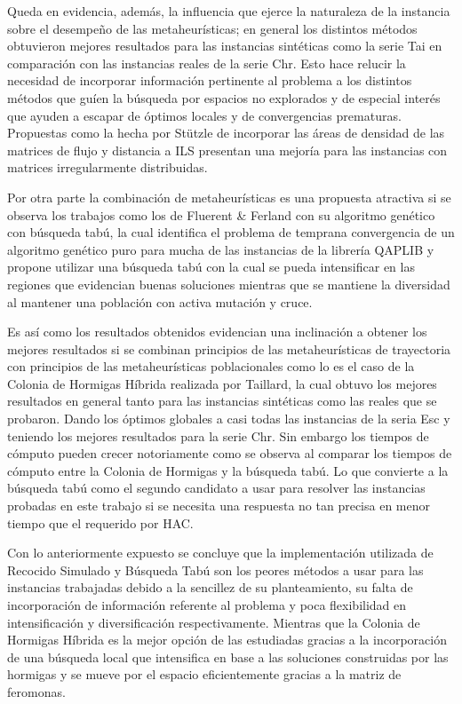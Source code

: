 \documentclass{ci5652}
\begin{document}
Queda en evidencia, además, la influencia que ejerce la naturaleza de la instancia sobre el desempeño de las metaheurísticas; en general los distintos métodos obtuvieron mejores resultados para las instancias sintéticas como la serie Tai en comparación con las instancias reales de la serie Chr. Esto hace relucir la necesidad de incorporar información pertinente al problema a los distintos métodos que guíen la búsqueda por espacios no explorados y de especial interés que ayuden a escapar de óptimos locales y de convergencias prematuras. Propuestas como la hecha por Stützle de incorporar las áreas de densidad de las matrices de flujo y distancia a ILS presentan una mejoría para las instancias con matrices irregularmente distribuidas.

Por otra parte la combinación de metaheurísticas es una propuesta atractiva si se observa los trabajos como los de Fluerent \& Ferland con su algoritmo genético con búsqueda tabú, la cual identifica el problema de temprana convergencia de un algoritmo genético puro para mucha de las instancias de la librería QAPLIB y propone utilizar una búsqueda tabú con la cual se pueda intensificar en las regiones que evidencian buenas soluciones mientras que se mantiene la diversidad al mantener una población con activa mutación y cruce.

Es así como los resultados obtenidos evidencian una inclinación a obtener los mejores resultados si se combinan principios de las metaheurísticas de trayectoria con principios de las metaheurísticas poblacionales como lo es el caso de la Colonia de Hormigas Híbrida realizada por Taillard, la cual obtuvo los mejores resultados en general tanto para las instancias sintéticas como las reales que se probaron. Dando los óptimos globales a casi todas las instancias de la seria Esc y teniendo los mejores resultados para la serie Chr. Sin embargo los tiempos de cómputo pueden crecer notoriamente como se observa al comparar los tiempos de cómputo entre la Colonia de Hormigas y la búsqueda tabú. Lo que convierte a la búsqueda tabú como el segundo candidato a usar para resolver las instancias probadas en este trabajo si se necesita una respuesta no tan precisa en menor tiempo que el requerido por HAC. 

Con lo anteriormente expuesto se concluye que la implementación utilizada de Recocido Simulado y Búsqueda Tabú son los peores métodos a usar para las instancias trabajadas debido a la sencillez de su planteamiento, su falta de incorporación de información referente al problema y poca flexibilidad en intensificación y diversificación respectivamente. Mientras que la Colonia de Hormigas Híbrida es la mejor opción de las estudiadas gracias a la incorporación de una búsqueda local que intensifica en base a las soluciones construidas por las hormigas y se mueve por el espacio eficientemente gracias a la matriz de feromonas. 
\end{document}
